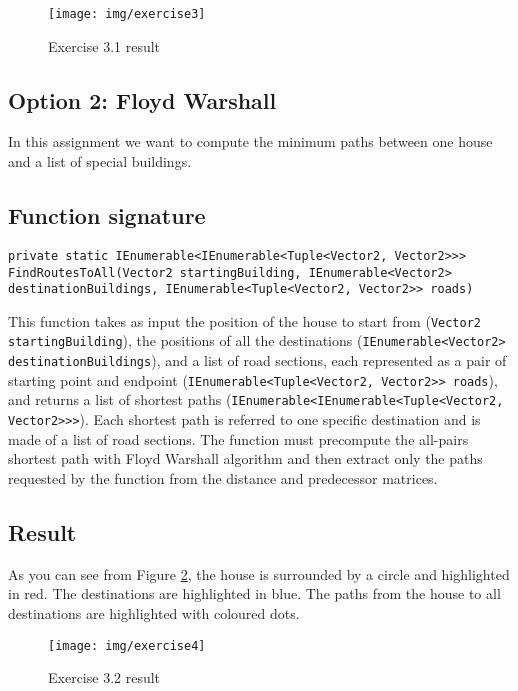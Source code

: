 \begin{figure}[!h]
\centering
\texttt{[image: img/exercise3]}
\caption{Exercise 3.1 result}
\label{img:Ex3-1}
\end{figure}


\subsection*{Option 2: Floyd Warshall}
In this assignment we want to compute the minimum paths between one house and a list of special buildings. 

\subsection*{Function signature} 
\begin{lstlisting}
private static IEnumerable<IEnumerable<Tuple<Vector2, Vector2>>> FindRoutesToAll(Vector2 startingBuilding, IEnumerable<Vector2> destinationBuildings, IEnumerable<Tuple<Vector2, Vector2>> roads)
\end{lstlisting}

\noindent
This function takes as input the position of the house to start from (\texttt{Vector2 startingBuilding}), the positions of all the destinations (\texttt{IEnumerable<Vector2> destinationBuildings}), and a list of road sections, each represented as a pair of starting point and endpoint (\texttt{IEnumerable<Tuple<Vector2, Vector2>> roads}), and returns a list of shortest paths (\texttt{IEnumerable<IEnumerable<Tuple<Vector2, Vector2>>>}). Each shortest path is referred to one specific destination and is made of a list of road sections.
The function must precompute the all-pairs shortest path with Floyd Warshall algorithm and then extract only the paths requested by the function from the distance and predecessor matrices.\\

\subsection*{Result}
As you can see from Figure \ref{img:Ex3-2}, the house is surrounded by a circle and highlighted in red. The destinations are highlighted in blue. The paths from the house to all destinations are highlighted with coloured dots.

\begin{figure}
\centering
\texttt{[image: img/exercise4]}
\caption{Exercise 3.2 result}
\label{img:Ex3-2}
\end{figure}
